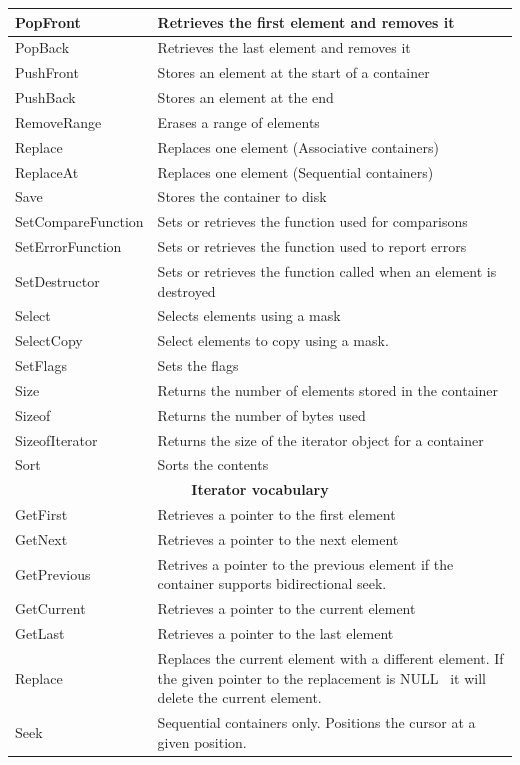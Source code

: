 \documentclass[12pt,a4paper]{memoir} %
\newif\iftth
\newcommand{\Null}{{\iftth \ NULL \else \footnotesize NULL\  \fi}}
\begin{document}
{\begin{longtable}{|p{3.5cm}|p{10.5cm}|}
PopFront & Retrieves the first element and removes it\\\hline
PopBack& Retrieves the last element and removes it\\\hline
PushFront & Stores an element at the start of a container\\\hline
PushBack& Stores an element at the end \\\hline
RemoveRange&Erases a range of elements \\\hline
Replace & Replaces one element (Associative containers)\\\hline
ReplaceAt & Replaces one element (Sequential containers) \\\hline
Save&Stores the container to disk \\\hline
SetCompareFunction&Sets or retrieves the function used for comparisons \\\hline
SetErrorFunction&Sets or retrieves the function used to report errors\\\hline
SetDestructor&Sets or retrieves the function called when an element is destroyed \\\hline
Select&Selects elements using a mask \\\hline
SelectCopy&Select elements to copy using a mask.\\\hline
SetFlags&Sets the flags\\\hline
Size&Returns the number of elements stored in the container \\\hline
Sizeof&Returns the number of bytes used \\\hline
SizeofIterator&Returns the size of the iterator object for a container \\\hline
Sort&Sorts the contents \\\hline
 
\multicolumn{2}{|c|}{ \textbf{Iterator vocabulary}} \\\hline
GetFirst & Retrieves a pointer to the first element\\\hline
GetNext & Retrieves a pointer to the next element \\\hline
GetPrevious & Retrives a pointer to the previous element if the container supports bidirectional seek.\\\hline
GetCurrent& Retrieves a pointer to the current element \\\hline
GetLast & Retrieves a pointer to the last element \\\hline
Replace & Replaces the current element with a different element. If the given pointer to the replacement is \Null 
it will delete the current element.\\\hline
Seek& Sequential containers only. Positions the cursor at a given position.\\\hline
\end{longtable}
} %
\end{document}
